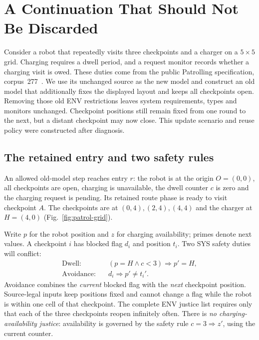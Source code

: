 \section{A Continuation That Should Not Be Discarded}
\label{sec:motivation}
Consider a robot that repeatedly visits three checkpoints and a charger on a
$5\times5$ grid. Charging requires a dwell period, and a request monitor
records whether a charging visit is owed. These duties come from the public
Patrolling specification, corpus~277~\cite{kindartifact}. We use its unchanged
source as the new model and construct an old model that additionally fixes
the displayed layout and keeps all checkpoints open. Removing those old ENV
restrictions leaves system requirements, types and monitors unchanged.
Checkpoint positions still remain fixed from one round to the next, but a
distant checkpoint may now close. This update scenario and reuse policy
were constructed after diagnosis.

\subsection{The retained entry and two safety rules}
An allowed old-model step reaches entry $r$: the robot is at the origin
$O=(0,0)$, all checkpoints are open, charging is unavailable, the dwell
counter $c$ is zero and the charging request is pending. Its retained route phase
is ready to visit checkpoint $A$. The checkpoints are at
$(0,4),(2,4),(4,4)$ and the charger at $H=(4,0)$
(Fig.~\ref{fig:patrol-grid}).


Write $p$ for the robot position and $z$ for charging availability; primes denote next values. A checkpoint $i$ has
blocked flag $d_i$ and position $t_i$. Two SYS safety duties will conflict:
\begin{equation}
\begin{aligned}
\text{Dwell:}\quad &(p=H\land c<3)\Rightarrow p'=H,\\
\text{Avoidance:}\quad &d_i\Rightarrow p'\ne t_i'.
\end{aligned}
\label{eq:patrol-conflict}
\end{equation}
Avoidance combines the \emph{current} blocked flag with the \emph{next}
checkpoint position. Source-legal inputs keep positions fixed and cannot
change a flag while the robot is within one cell of that checkpoint.
The complete ENV justice list requires only that each of the three
checkpoints reopen infinitely often. There is \emph{no charging-availability
justice}: availability is governed by the safety rule $c=3\Rightarrow z'$,
using the current counter.

